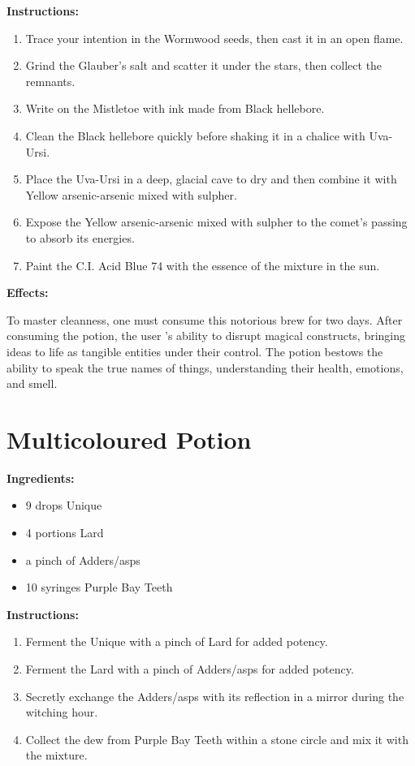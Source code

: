 \documentclass{article}
\begin{document}
\textbf{Instructions:}

\begin{enumerate}
  \item Trace your intention in the Wormwood seeds, then cast it in an open flame.
  \item Grind the Glauber's salt and scatter it under the stars, then collect the remnants.
  \item Write on the Mistletoe with ink made from Black hellebore.
  \item Clean the Black hellebore quickly before shaking it in a chalice with Uva-Ursi.
  \item Place the Uva-Ursi in a deep, glacial cave to dry and then combine it with Yellow arsenic-arsenic mixed with sulpher.
  \item Expose the Yellow arsenic-arsenic mixed with sulpher to the comet’s passing to absorb its energies.
  \item Paint the C.I. Acid Blue 74 with the essence of the mixture in the sun.
\end{enumerate}

\textbf{Effects:}

To master cleanness, one must consume this notorious brew for two days. After consuming the potion, the user 's ability to disrupt magical constructs, bringing ideas to life as tangible entities under their control. The potion bestows the ability to speak the true names of things, understanding their health, emotions, and smell.

\newpage
\section*{Multicoloured Potion}

\textbf{Ingredients:}

\begin{itemize}
  \item 9 drops Unique
  \item 4 portions Lard
  \item a pinch of Adders/asps
  \item 10 syringes Purple Bay Teeth
\end{itemize}

\textbf{Instructions:}

\begin{enumerate}
  \item Ferment the Unique with a pinch of Lard for added potency.
  \item Ferment the Lard with a pinch of Adders/asps for added potency.
  \item Secretly exchange the Adders/asps with its reflection in a mirror during the witching hour.
  \item Collect the dew from Purple Bay Teeth within a stone circle and mix it with the mixture.
\end{enumerate}
\end{document}
